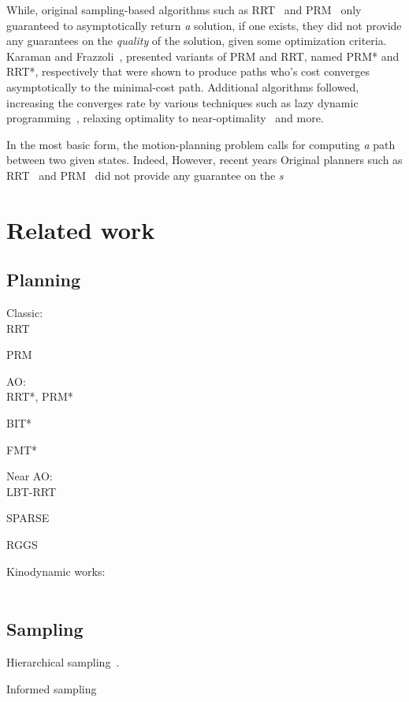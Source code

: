 \documentclass[letterpaper, 10 pt, conference]{ieeeconf}  %
\begin{document}
While, original sampling-based algorithms such as RRT~\cite{LK01} and PRM~\cite{KSLO96} only guaranteed to asymptotically return \emph{a} solution, if one exists, they did not provide any guarantees on the \emph{quality} of the solution, given some optimization criteria.
Karaman and Frazzoli~\cite{KF11}, presented variants of PRM and RRT, named PRM* and RRT*, respectively that were shown to produce paths who's cost converges asymptotically to the minimal-cost path.
Additional algorithms followed, increasing the converges rate by various techniques such as lazy dynamic programming~\cite{GSB15, JSCP15}, relaxing optimality to near-optimality~\cite{DB14, SH16} and more.


In the most basic form, the motion-planning problem calls for computing \emph{a} path between two given states.
Indeed, 
However, recent years 
Original planners such as RRT~\cite{LK01} and PRM~\cite{KSLO96} did not provide any guarantee on the \emph{s}


\section{Related work}
\label{sec:related_work}


\subsection{Planning}


Classic:\\
RRT~\cite{LK01}

PRM~\cite{KSLO96}

AO:\\
RRT*, PRM*~\cite{KF11}

BIT*~\cite{GSB15}

FMT*~\cite{JSCP15}

Near AO:\\
LBT-RRT~\cite{SH16}

SPARSE~\cite{DB14}


RGGS~\cite{SSH16}


Kinodynamic works:\\~\cite{SL14, XBPA15, WB13, KF10}

\subsection{Sampling}

Hierarchical sampling~\cite{KTC16}.

Informed sampling~\cite{GSB14}
\end{document}
